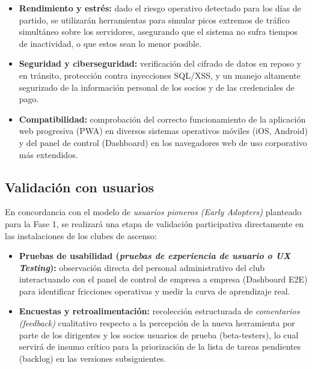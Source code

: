 \begin{itemize}
    \item \textbf{Rendimiento y estrés:} dado el riesgo operativo detectado para los días de partido, se utilizarán herramientas para simular picos extremos de tráfico simultáneo sobre los servidores, asegurando que el sistema no sufra tiempos de inactividad, o que estos sean lo menor posible.
    \item \textbf{Seguridad y ciberseguridad:} verificación del cifrado de datos en reposo y en tránsito, protección contra inyecciones SQL/XSS, y un manejo altamente segurizado de la información personal de los socios y de las credenciales de pago.
    \item \textbf{Compatibilidad:} comprobación del correcto funcionamiento de la aplicación web progresiva (PWA) en diversos sistemas operativos móviles (iOS, Android) y del panel de control (Dashboard) en los navegadores web de uso corporativo más extendidos.
\end{itemize}

\subsection{Validación con usuarios}

En concordancia con el modelo de \textit{usuarios pioneros (Early Adopters)} planteado para la Fase 1, se realizará una etapa de validación participativa directamente en las instalaciones de los clubes de ascenso:

\begin{itemize}
    \item \textbf{Pruebas de usabilidad (\textit{pruebas de experiencia de usuario o UX Testing}):} observación directa del personal administrativo del club interactuando con el panel de control de empresa a empresa (Dashboard E2E) para identificar fricciones operativas y medir la curva de aprendizaje real.
    \item \textbf{Encuestas y retroalimentación:} recolección estructurada de \textit{comentarios (feedback)} cualitativo respecto a la percepción de la nueva herramienta por parte de los dirigentes y los socios usuarios de prueba (beta-testers), lo cual servirá de insumo crítico para la priorización de la lista de tareas pendientes (backlog) en las versiones subsiguientes.
\end{itemize}
